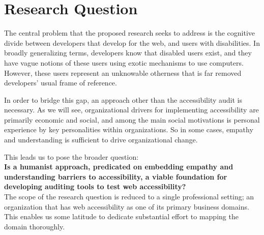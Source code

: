\section{Research Question} %
\label{sec:research_question}

The central problem that the proposed research seeks to address is the cognitive divide between developers that develop for the web, and users with disabilities. In broadly generalizing terms, developers know that disabled users exist, and they have vague notions of these users using exotic mechanisms to use computers. However, these users represent an unknowable otherness that is far removed developers' usual frame of reference.

In order to bridge this gap, an approach other than the accessibility audit is necessary. As we will see, organizational drivers for implementing accessibility are primarily economic and social, and among the main social motivations is personal experience by key personalities within organizations. So in some cases, empathy and understanding is sufficient to drive organizational change. 

This leads us to pose the broader question: \\

\textbf{Is a humanist approach, predicated on embedding empathy and understanding barriers to accessibility, a viable foundation for developing auditing tools to test web accessibility?}\\

The scope of the research question is reduced to a single professional setting; an organization that has web accessibility as one of its primary business domains. This enables us some latitude to dedicate substantial effort to mapping the domain thoroughly.

